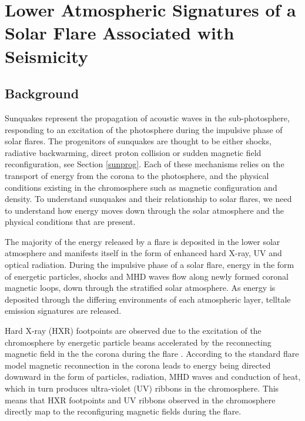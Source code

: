 \section{Lower Atmospheric Signatures of a Solar Flare Associated with Seismicity}




\subsection{Background} 
Sunquakes represent the propagation of acoustic waves in the sub-photosphere, responding to an excitation of the photosphere during the impulsive phase of solar flares. The progenitors of sunquakes are thought to be either shocks, radiative backwarming, direct proton collision or sudden magnetic field reconfiguration, see Section \ref{sunprog}. Each of these mechanisms relies on the transport of energy from the corona to the photosphere, and the physical conditions existing in the chromosphere such as magnetic configuration and density. To understand sunquakes and their relationship to solar flares, we need to understand how energy moves down through the solar atmosphere and the physical conditions that are present. 

The majority of the energy released by a flare is deposited in the lower solar atmosphere and manifests itself in the form of enhanced hard X-ray, UV and optical radiation. During the impulsive phase of a solar flare, energy in the form of energetic particles, shocks and MHD waves flow along newly formed coronal magnetic loops, down through the stratified solar atmosphere. As energy is deposited through the differing environments of each atmospheric layer, telltale emission signatures are released. 

Hard X-ray (HXR) footpoints are observed due to the excitation of the chromosphere by energetic particle beams accelerated by the reconnecting magnetic field in the the corona during the flare \citep{1995ApJ...455..347A}. According to the standard flare model \citep{1964NASSP..50..451C, 1966Natur.211..695S, 1974SoPh...34..323H, 1976SoPh...50...85K} magnetic reconnection in the corona leads to energy being directed downward in the form of particles, radiation, MHD waves and conduction of heat, which in turn produces ultra-violet (UV) ribbons in the chromosphere. This means that HXR footpoints and UV ribbons observed in the chromosphere directly map to the reconfiguring magnetic fields during the flare. 

